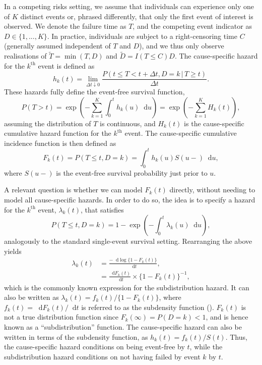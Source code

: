 \documentclass[
  letterpaper,
  paper=240mm:170mm,
  twoside=true,
  open=right,
  fontsize=10pt,
  pagesize=false,
  BCOR=15mm,
  DIV=14,
  headinclude=true,
  footinclude=false,
  headsepline=on]{scrbook}
\newcommand{\given}{\,|\,}
\newcommand\diff{\mathop{}\!\mathrm{d}}
\begin{document}
In a competing risks setting, we assume that individuals can experience
only one of \(K\) distinct events or, phrased differently, that only the
first event of interest is observed. We denote the failure time as
\(T\), and the competing event indicator as \(D \in \{1,...,K\}\). In
practice, individuals are subject to a right-censoring time \(C\)
(generally assumed independent of \(T\) and \(D\)), and we thus only
observe realisations of \(\tilde{T} = \min(T, D)\) and
\(\tilde{D} = I(T \leq C)D\). The cause-specific hazard for the
\(k^{\text{th}}\) event is defined as\\
\begin{equation*}
    h_k(t) = \lim_{\Delta t \downarrow 0} \frac{P(t \leq T < t + \Delta t, D = k \given T \geq t)}{\Delta t}.
\end{equation*} These hazards fully define the event-free survival
function, \begin{equation*}
    P(T > t) = \exp \left( - \sum_{k = 1}^{K} \int_{0}^{t} h_k(u)\diff u \right) = \exp \left( - \sum_{k = 1}^{K} H_k(t) \right),
\end{equation*} assuming the distribution of \(T\) is continuous, and
\(H_k(t)\) is the cause-specific cumulative hazard function for the
\(k^{\text{th}}\) event. The cause-specific cumulative incidence
function is then defined as \begin{equation*}
    F_k(t) = P(T \leq t, D = k) = \int_{0}^{t}h_k(u)S(u-)\diff u,
\end{equation*} where \(S(u-)\) is the event-free survival probability
just prior to \(u\).

A relevant question is whether we can model \(F_k(t)\) directly, without
needing to model all cause-specific hazards. In order to do so, the idea
is to specify a hazard for the \(k^{\text{th}}\) event,
\(\lambda_k(t)\), that satisfies \begin{equation*}
    P(T \leq t, D = k) = 1 - \exp\left(-\int_{0}^{t}\lambda_k(u)\diff u\right),
\end{equation*} analogously to the standard single-event survival
setting. Rearranging the above yields \begin{align*}
    \lambda_k(t) &= \frac{-\diff \log \{1 - F_k(t)\}}{\diff t}, \\
    &= \frac{\diff F_k(t)}{\diff t} \times \{1 - F_k(t)\}^{-1}, 
\end{align*} which is the commonly known expression for the
subdistribution hazard. It can also be written as
\(\lambda_k(t) = f_k(t)/\{1 - F_k(t)\}\), where
\(f_k(t) = \diff F_k(t)/\diff t\) is referred to as the subdensity
function ().
\(F_k(t)\) is not a true distribution function since
\(F_k(\infty)=P(D=k)<1\), and is hence known as a ``subdistribution''
function. The cause-specific hazard can also be written in terms of the
subdensity function, as \(h_k(t) = f_k(t)/S(t)\). Thus, the
cause-specific hazard conditions on being event-free by \(t\), while the
subdistribution hazard conditions on not having failed by event \(k\) by
\(t\).
\end{document}
